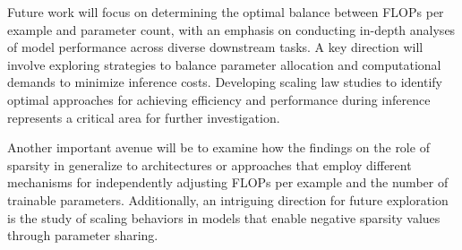 Future work will focus on determining the optimal balance between FLOPs per example and parameter count, with an emphasis on conducting in-depth analyses of model performance across diverse downstream tasks. A key direction will involve exploring strategies to balance parameter allocation and computational demands to minimize inference costs. Developing scaling law studies to identify optimal approaches for achieving efficiency and performance during inference represents a critical area for further investigation.

Another important avenue will be to examine how the findings on the role of sparsity in \moes generalize to architectures or approaches that employ different mechanisms for independently adjusting FLOPs per example and the number of trainable parameters. Additionally, an intriguing direction for future exploration is the study of scaling behaviors in models that enable negative sparsity values through parameter sharing.
